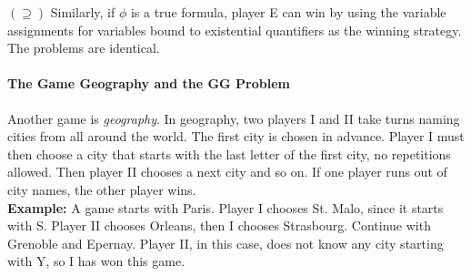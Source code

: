 \documentclass[10pt,fleqn]{article}
\theoremstyle{definition}
\theoremstyle{remark}
\begin{document}
\((\supseteq)\) Similarly, if \(\phi\) is a true formula, player E can win by using the variable assignments for variables bound to existential quantifiers as the winning strategy. The problems are identical.

\paragraph*{The Game Geography and the GG Problem} Another game is \emph{geography}. In geography, two players I and II take turns naming cities from all around the world. The first city is chosen in advance. Player I must then choose a city that starts with the last letter of the first city, no repetitions allowed. Then player II chooses a next city and so on. If one player runs out of city names, the other player wins.\\

\textbf{Example:} A game starts with Paris. Player I chooses St. Malo, since it starts with S. Player II chooses Orleans, then I chooses Strasbourg. Continue with Grenoble and Epernay. Player II, in this case, does not know any city starting with Y, so I has won this game.
\end{document}

